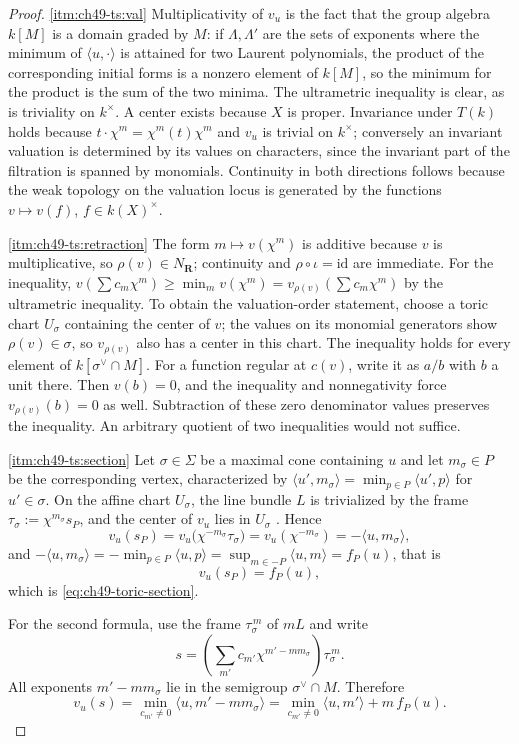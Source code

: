 \begin{proof}
\cref{itm:ch49-ts:val}  Multiplicativity of $v_u$ is the fact that the
group algebra $k[M]$ is a domain graded by $M$: if
$\Lambda,\Lambda'$ are the sets of exponents where the minimum of
$\langle u,\cdot\rangle$ is attained for two Laurent polynomials, the
product of the corresponding initial forms is a nonzero element of
$k[M]$, so the minimum for the product is the sum of the two minima.  The
ultrametric inequality is clear, as is triviality on $k^\times$.  A
center exists because $X$ is proper.  Invariance under $T(k)$ holds
because $t\cdot\chi^m=\chi^m(t)\chi^m$ and $v_u$ is trivial on
$k^\times$; conversely an invariant valuation is determined by its values
on characters, since the invariant part of the filtration is spanned by
monomials.  Continuity in both directions follows because the weak topology
on the valuation locus is generated by the functions $v\mapsto v(f)$,
$f\in k(X)^\times$.

\cref{itm:ch49-ts:retraction}  The form $m\mapsto v(\chi^m)$ is additive
because $v$ is multiplicative, so $\rho(v)\in N_{\mathbf R}$;
continuity and $\rho\circ\iota=\mathrm{id}$ are immediate.  For the
inequality, $v(\sum c_m\chi^m)\ge\min_mv(\chi^m)
=v_{\rho(v)}(\sum c_m\chi^m)$ by the ultrametric inequality.  To obtain the valuation-order statement, choose a toric chart
$U_\sigma$ containing the center of $v$; the values on its monomial
generators show $\rho(v)\in\sigma$, so $v_{\rho(v)}$ also has a
center in this chart.  The inequality holds for every element of
$k[\sigma^\vee\cap M]$.  For a function regular at $c(v)$, write it
as $a/b$ with $b$ a unit there.  Then $v(b)=0$, and the inequality
and nonnegativity force $v_{\rho(v)}(b)=0$ as well.  Subtraction of
these zero denominator values preserves the inequality.
An arbitrary quotient of two inequalities would not suffice.

\cref{itm:ch49-ts:section}  Let $\sigma\in\Sigma$ be a maximal cone
containing $u$ and let $m_\sigma\in P$ be the corresponding vertex,
characterized by
$\langle u',m_\sigma\rangle=\min_{p\in P}\langle u',p\rangle$ for
$u'\in\sigma$.  On the affine chart $U_\sigma$, the line bundle $L$
is trivialized by the frame $\tau_\sigma:=\chi^{m_\sigma}s_P$, and the
center of $v_u$ lies in $U_\sigma$
\cite[Theorem~4.2.8 and \S6.1]{CLS11}.  Hence
\[
 v_u(s_P)=v_u\bigl(\chi^{-m_\sigma}\tau_\sigma\bigr)
 =v_u(\chi^{-m_\sigma})=-\langle u,m_\sigma\rangle,
\]
and $-\langle u,m_\sigma\rangle=-\min_{p\in P}\langle u,p\rangle
=\sup_{m\in-P}\langle u,m\rangle=f_P(u)$, that is
\[
 v_u(s_P)=f_P(u),
\]
which is \eqref{eq:ch49-toric-section}.

For the second formula, use the frame $\tau_\sigma^{\,m}$ of $mL$ and
write
\[
 s=\left(\sum_{m'}c_{m'}\chi^{m'-mm_\sigma}\right)\tau_\sigma^{\,m}.
\]
All
exponents $m'-mm_\sigma$ lie in the semigroup
$\sigma^\vee\cap M$.  Therefore
\[
 v_u(s)=\min_{c_{m'}\ne0}\langle u,m'-mm_\sigma\rangle
 =\min_{c_{m'}\ne0}\langle u,m'\rangle+m\,f_P(u).
\]
\end{proof}

